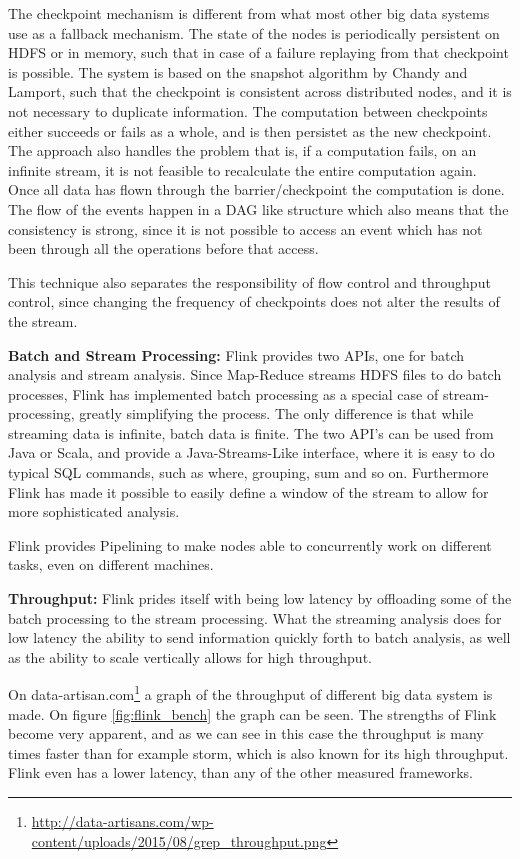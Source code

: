 The checkpoint mechanism is different from what most other big data systems use as a fallback mechanism. The state of the nodes is periodically persistent on HDFS or in memory, such that in case of a failure replaying from that checkpoint is possible. The system is based on the snapshot algorithm by Chandy and Lamport, such that the checkpoint is consistent across distributed nodes, and it is not necessary to duplicate information. The computation between checkpoints either succeeds or fails as a whole, and is then persistet as the new checkpoint. The approach also handles the problem that is, if a computation fails, on an infinite stream, it is not feasible to recalculate the entire computation again. Once all data has flown through the barrier/checkpoint the computation is done. The flow of the events happen in a DAG like structure which also means that the consistency is strong, since it is not possible to access an event which has not been through all the operations before that access.

This technique also separates the responsibility of flow control and throughput control, since changing the frequency of checkpoints does not alter the results of the stream.

\newpar \textbf{Batch and Stream Processing:} Flink provides two APIs, one for batch analysis and stream analysis. Since Map-Reduce streams HDFS files to do batch processes, Flink has implemented batch processing as a special case of stream-processing, greatly simplifying the process. The only difference is that while streaming data is infinite, batch data is finite. The two API's can be used from Java or Scala, and provide a Java-Streams-Like interface, where it is easy to do typical SQL commands, such as where, grouping, sum and so on. Furthermore Flink has made it possible to easily define a window of the stream to allow for more sophisticated analysis.

Flink provides Pipelining to make nodes able to concurrently work on different tasks, even on different machines.

\newpar \textbf{Throughput:} Flink prides itself with being low latency by offloading some of the batch processing to the stream processing. What the streaming analysis does for low latency the ability to send information quickly forth to batch analysis, as well as the ability to scale vertically allows for high throughput. 

On data-artisan.com\footnote{ \url{http://data-artisans.com/wp-content/uploads/2015/08/grep_throughput.png}} a graph of the throughput of different big data system is made. On figure \ref{fig:flink_bench} the graph can be seen. The strengths of Flink become very apparent, and as we can see in this case the throughput is many times faster than for example storm, which is also known for its high throughput. Flink even has a lower latency, than any of the other measured frameworks.

